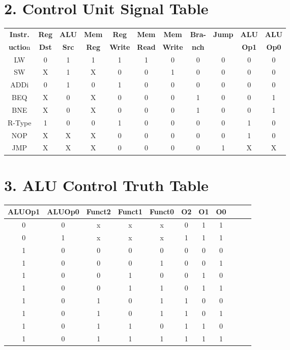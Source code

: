 \documentclass[12pt, onecolumn]{report}
\begin{document}
\section*{2. Control Unit Signal Table}
\begin{table}[h!]
\centering
\begin{tabular}{|c|c|c|c|c|c|c|c|c|c|c|}
\hline
\textbf{Instr.} & \textbf{Reg} & \textbf{ALU} & \textbf{Mem} & \textbf{Reg} & \textbf{Mem} & \textbf{Mem} & \textbf{Bra-} & \textbf{Jump} & \textbf{ALU} & \textbf{ALU} \\
\textbf{uctio}n& \textbf{Dst} & \textbf{Src} & \textbf{Reg} & \textbf{Write} & \textbf{Read} & \textbf{Write} & \textbf{nch}&  & \textbf{Op1} & \textbf{Op0} \\
\hline
LW & 0 & 1 & 1 & 1 & 1 & 0 & 0 & 0 & 0 & 0 \\\hline
SW & X & 1 & X & 0 & 0 & 1 & 0 & 0 & 0 & 0 \\\hline
ADDi & 0 & 1 & 0 & 1 & 0 & 0 & 0 & 0 & 0 & 0 \\\hline
BEQ & X & 0 & X & 0 & 0 & 0 & 1 & 0 & 0 & 1 \\\hline
BNE & X & 0 & X & 0 & 0 & 0 & 1 & 0 & 0 & 1 \\\hline
R-Type & 1 & 0 & 0 & 1 & 0 & 0 & 0 & 0 & 1 & 0 \\\hline
NOP & X & X & X & 0 & 0 & 0 & 0 & 0 & 1 & 0 \\\hline
JMP & X & X & X & 0 & 0 & 0 & 0 & 1 & X & X \\\hline
\end{tabular}
\end{table}
\newpage

\section*{3. ALU Control Truth Table}
\begin{table}[h!]
\centering
\begin{tabular}{|c|c|c|c|c|c|c|c|c|c|c|}
\hline
\textbf{ALUOp1} & \textbf{ALUOp0} & \textbf{Funct2} & \textbf{Funct1} & \textbf{Funct0} & \textbf{O2} & \textbf{O1} & \textbf{O0} \\
\hline
0 & 0 & x & x & x & 0 & 1 & 1 \\ \hline
0 & 1 & x & x & x & 1 & 1 & 1 \\ \hline
1 & 0 & 0 & 0 & 0 & 0 & 0 & 0 \\ \hline
1 & 0 & 0 & 0 & 1 & 0 & 0 & 1 \\ \hline
1 & 0 & 0 & 1 & 0 & 0 & 1 & 0 \\ \hline
1 & 0 & 0 & 1 & 1 & 0 & 1 & 1 \\ \hline
1 & 0 & 1 & 0 & 1 & 1 & 0 & 0 \\ \hline
1 & 0 & 1 & 0 & 1 & 1 & 0 & 1 \\ \hline
1 & 0 & 1 & 1 & 0 & 1 & 1 & 0 \\ \hline
1 & 0 & 1 & 1 & 1 & 1 & 1 & 1 \\ 
\hline
\end{tabular}
\end{table}
\end{document}
